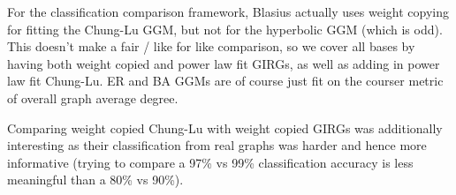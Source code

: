 For the classification comparison framework, Blasius actually uses weight copying for fitting the Chung-Lu GGM, but not for the hyperbolic GGM (which is odd). This doesn't make a fair / like for like comparison, so we cover all bases by having both weight copied and power law fit GIRGs, as well as adding in power law fit Chung-Lu. ER and BA GGMs are of course just fit on the courser metric of overall graph average degree.

Comparing weight copied Chung-Lu with weight copied GIRGs was additionally interesting as their classification from real graphs was harder and hence more informative (trying to compare a 97\% vs 99\% classification accuracy is less meaningful than a 80\% vs 90\%).



